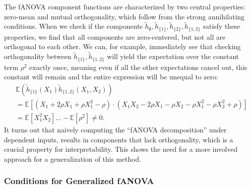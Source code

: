 The fANOVA component functions are characterized by two central properties: zero-mean and mutual orthogonality, which follow from the strong annihilating conditions.
When we check if the components $\tilde{h}_{\emptyset}, \tilde{h}_{\{1\}}, \tilde{h}_{\{2\}}, \tilde{h}_{\{1,2\}}$ satisfy these properties, we find that all components are zero-centered, but not all are orthogonal to each other. We can, for example, immediately see that checking orthogonality between $\tilde{h}_{\{1\}}, \tilde{h}_{\{1,2\}}$ will yield the expectation over the constant term $\rho^2$ exactly once, meaning even if all the other expectations cancel out, this constant will remain and the entire expression will be unequal to zero:
\begin{align*}
    &\mathbb{E}(\tilde{h}_{\{1\}}(X_1)\tilde{h}_{\{1,2\}}(X_1, X_2)) \\
    &= \mathbb{E}[(X_1 + 2\rho X_1 + \rho X_1^2 - \rho) \cdot (X_1 X_2 - 2\rho X_1 - \rho X_2 - \rho X_1^2 - \rho X_2^2 + \rho)] \\
    &= \mathbb{E}[X_{1}^2X_2] \ldots - \mathbb{E}[\rho^2] \neq 0.
\end{align*}
It turns out that naively computing the ``fANOVA decomposition'' under dependent inputs, results in components that lack orthogonality, which is a crucial property for interpretability.
This shows the need for a more involved approach for a generalization of this method.

\subsubsection{Conditions for Generalized fANOVA}

